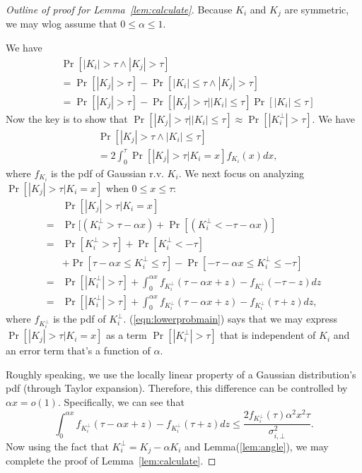 \begin{proof}[Outline of proof for Lemma~\ref{lem:calculate}]
Because $K_i$ and $K_j$ are symmetric, we may wlog assume that $0 \leq \alpha \leq 1$. 

We have
\begin{equation}
\begin{split}
   & \Pr[|K_i| > \tau \wedge |K_j| > \tau ]\\
    &= \Pr[|K_j| > \tau] - \Pr[|K_i| \leq \tau \wedge |K_j| > \tau ]    \\ 
     &=\Pr[|K_j| > \tau] - \Pr[ |K_j| > \tau | |K_i| \leq \tau]\Pr[ |K_i| \leq \tau]
\end{split}
\end{equation}
Now the key is to show that $\Pr[ |K_j| > \tau | |K_i| \leq \tau] \approx \Pr[ |K^{\bot}_i| > \tau]$. We have
\begin{equation} \label{eqn:temp11}
\begin{split}
    &\Pr\left[|K_j |>\tau \wedge | K_i | \leq \tau \right]\\
    &= 2 \int_0^{\tau} \Pr\left[|K_j |>\tau \Big | K_i = x\right]f_{K_i}(x) dx,
\end{split}
\end{equation}
where $f_{K_i}$ is the pdf of Gaussian r.v. $K_i$. We next focus on analyzing $\Pr[|K_j|> \tau | K_i = x]$ when $0 \leq x \leq \tau$:
{\small
\begin{equation}\label{eqn:lowerprobmain}
\begin{split}
    & \Pr[|K_j|> \tau | K_i = x]\\ 
    =&\Pr[(K^{\bot}_i > \tau - \alpha x) + \Pr[(K^{\bot}_i < - \tau - \alpha x)]   \\ 
    =& \Pr[K^{\bot}_i > \tau] + \Pr[K^{\bot}_i < - \tau] \\ 
    &+ \Pr[\tau - \alpha x \leq K^{\bot}_i \leq \tau] - \Pr[-\tau - \alpha x \leq K^{\bot}_i \leq -\tau]  \\ 
    =& \Pr[|K^{\bot}_i| > \tau] +  \int_0^{\alpha x}f_{K^{\bot}_i}(\tau - \alpha x+z) - f_{K^{\bot}_i}(-\tau - z)dz  \\ 
    =& \Pr[|K^{\bot}_i| > \tau] +  \int_0^{\alpha x}f_{K^{\bot}_i}(\tau - \alpha x+z) - f_{K^{\bot}_i}(\tau + z)dz,
\end{split}
\end{equation}
}
where $f_{K^{\bot}_i}$ is the pdf of $K^{\bot}_i$. 
(\ref{eqn:lowerprobmain}) says that we may express $\Pr[|K_j|> \tau | K_i = x]$ as a term $\Pr[|K^{\bot}_i|> \tau]$  that is independent of $K_i$ and an error term that's a function of $\alpha$. 

Roughly speaking, we use the locally linear property of a Gaussian distribution's pdf (through Taylor expansion). Therefore, this difference can be controlled by $\alpha x = o(1)$.  Specifically, we can see that 
\begin{equation}
    \int_0^{\alpha x}f_{K^{\bot}_i}(\tau - \alpha x+z) - f_{K^{\bot}_i}(\tau + z)dz  \leq \frac{2f_{K^{\bot}_i}(\tau )\alpha^2 x^2 \tau}{\sigma^2_{i,\bot}}. 
\end{equation}
 Now using the fact that 
$K^{\bot}_i = K_j - \alpha K_i$ and Lemma(\ref{lem:angle}), we may complete the proof of Lemma~\ref{lem:calculate}.
\end{proof}

